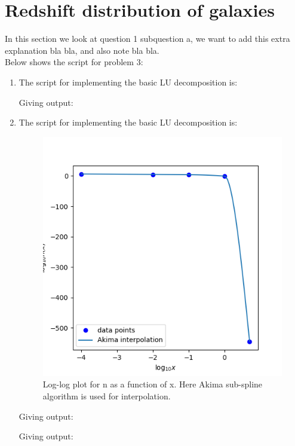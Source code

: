 \section{Redshift distribution of galaxies}

In this section we look at question 1 subquestion a, 
we want to add this extra explanation bla bla, and also 
note bla bla. \\

Below shows the script for problem 3:



\begin{enumerate}[label=(\alph*)]
    \item The script for implementing the basic LU decomposition is:
    
    Giving output:
    
    \item The script for implementing the basic LU decomposition is:
    
    \begin{figure}[h!]
    \centering
    \includegraphics[width=0.9\linewidth]{./problem3.png}
    \caption{Log-log plot for n as a function of x.  Here Akima sub-spline algorithm is used for interpolation.}
    \label{fig:fig1}
    \end{figure}
    Giving output:
    
    
    Giving output:
    
\end{enumerate}




